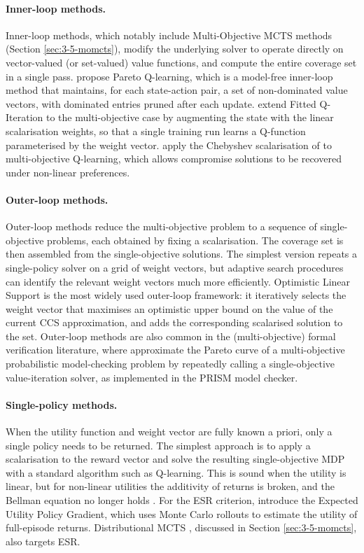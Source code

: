    \paragraph{Inner-loop methods.}
    Inner-loop methods, which notably include Multi-Objective MCTS methods (Section \ref{sec:3-5-momcts}), modify the underlying solver to operate directly on vector-valued (or set-valued) value functions, and compute the entire coverage set in a single pass. \citet{locally_optimal} propose Pareto Q-learning, which is a model-free inner-loop method that maintains, for each state-action pair, a set of non-dominated value vectors, with dominated entries pruned after each update. \citet{mofqi} extend Fitted Q-Iteration to the multi-objective case by augmenting the state with the linear scalarisation weights, so that a single training run learns a Q-function parameterised by the weight vector. \citet{morl_chebyshev} apply the Chebyshev scalarisation of \citet{moo_chebyshev} to multi-objective Q-learning, which allows compromise solutions to be recovered under non-linear preferences. %

    \paragraph{Outer-loop methods.}
    Outer-loop methods reduce the multi-objective problem to a sequence of single-objective problems, each obtained by fixing a scalarisation. The coverage set is then assembled from the single-objective solutions. The simplest version repeats a single-policy solver on a grid of weight vectors, but adaptive search procedures can identify the relevant weight vectors much more efficiently. Optimistic Linear Support \cite{cccs} is the most widely used outer-loop framework: it iteratively selects the weight vector that maximises an optimistic upper bound on the value of the current CCS approximation, and adds the corresponding scalarised solution to the set. Outer-loop methods are also common in the (multi-objective) formal verification literature, where \cite{prism_pareto} approximate the Pareto curve of a multi-objective probabilistic model-checking problem by repeatedly calling a single-objective value-iteration solver, as implemented in the PRISM model checker.

    \paragraph{Single-policy methods.}
    When the utility function and weight vector are fully known a priori, only a single policy needs to be returned. The simplest approach is to apply a scalarisation to the reward vector and solve the resulting single-objective MDP with a standard algorithm such as Q-learning. This is sound when the utility is linear, but for non-linear utilities the additivity of returns is broken, and the Bellman equation no longer holds \cite{survey_mo_seq_dec_make}. For the ESR criterion, \citet{eupg} introduce the Expected Utility Policy Gradient, which uses Monte Carlo rollouts to estimate the utility of full-episode returns. Distributional MCTS \cite{dmcts,dmcts_long}, discussed in Section \ref{sec:3-5-momcts}, also targets ESR.

